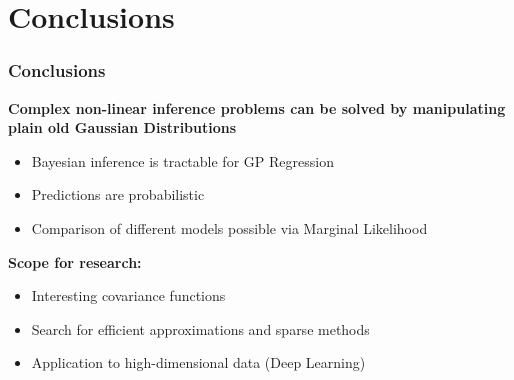 \documentclass[10pt]{beamer}
\begin{document}
  \section{Conclusions}

  \begin{frame}
    \frametitle{Conclusions}

    \textbf{Complex non-linear inference problems can be solved by manipulating plain old Gaussian Distributions}

    \begin{itemize}
      \item Bayesian inference is tractable for GP Regression
      \item Predictions are probabilistic
      \item Comparison of different models possible via Marginal Likelihood
    \end{itemize}

    \pause

    \textbf{Scope for research:}

    \begin{itemize}
      \item Interesting covariance functions
      \item Search for efficient approximations and sparse methods
      \item Application to high-dimensional data (Deep Learning)
    \end{itemize}

  \end{frame}
\end{document}
